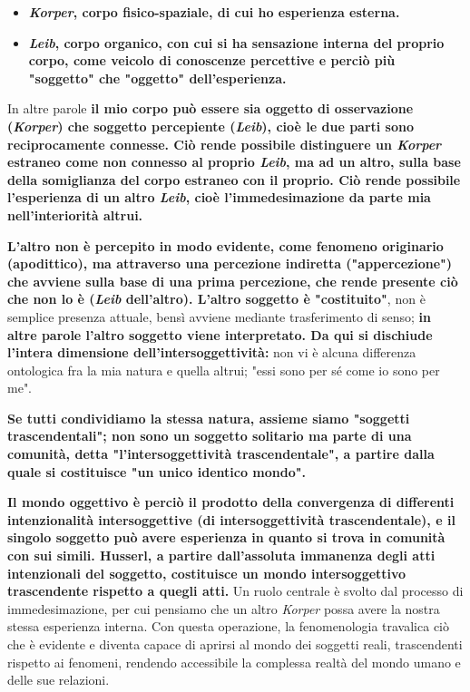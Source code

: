 \begin{itemize}
	\item \textbf{\textit{Korper}, corpo fisico-spaziale, di cui ho
	esperienza esterna.}
	\item \textbf{\textit{Leib}, corpo organico, con cui si ha sensazione
	interna del proprio corpo, come veicolo di
	conoscenze percettive e perciò più "soggetto"
	che "oggetto" dell'esperienza.}
\end{itemize}

In altre parole \textbf{il mio corpo può essere sia oggetto
di osservazione (\textit{Korper}) che soggetto percepiente
(\textit{Leib}), cioè le due parti sono reciprocamente connesse.
Ciò rende possibile distinguere un \textit{Korper} estraneo
come non connesso al proprio \textit{Leib}, ma ad
un altro, sulla base della somiglianza del
corpo estraneo con il proprio. Ciò rende possibile
l'esperienza di un altro \textit{Leib}, cioè l'immedesimazione
da parte mia nell'interiorità altrui.}

\textbf{L'altro non è percepito in modo evidente, come
fenomeno originario (apodittico), ma attraverso
una percezione indiretta ("appercezione") che
avviene sulla base di una prima percezione, che
rende presente ciò che non lo è (\textit{Leib} dell'altro).
L'altro soggetto è "costituito"}, non è semplice
presenza attuale, bensì avviene mediante
trasferimento di senso;\textbf{ in altre parole l'altro soggetto viene interpretato.
Da qui si dischiude l'intera dimensione dell'intersoggettività:} non vi è alcuna differenza
ontologica fra la mia natura e quella altrui;
"essi sono per sé come io sono per me".

\textbf{Se tutti condividiamo la stessa natura, assieme
siamo "soggetti trascendentali"; non sono
un soggetto solitario ma parte di una
comunità, detta "l'intersoggettività trascendentale",
a partire dalla quale si costituisce "un unico
identico mondo".}

\textbf{Il mondo oggettivo è perciò il prodotto della
convergenza di differenti intenzionalità
intersoggettive (di intersoggettività trascendentale),
e il singolo soggetto può avere esperienza in
quanto si trova in comunità con sui simili.
Husserl, a partire dall'assoluta immanenza degli atti
intenzionali del soggetto, costituisce un mondo
intersoggettivo trascendente rispetto a quegli atti.}
Un ruolo centrale è svolto dal processo di
immedesimazione, per cui pensiamo che un
altro \textit{Korper} possa avere la nostra stessa
esperienza interna. Con questa operazione, la
fenomenologia travalica ciò che è evidente
e diventa capace di aprirsi al mondo dei
soggetti reali, trascendenti rispetto ai
fenomeni, rendendo accessibile la complessa
realtà del mondo umano e delle sue relazioni.

